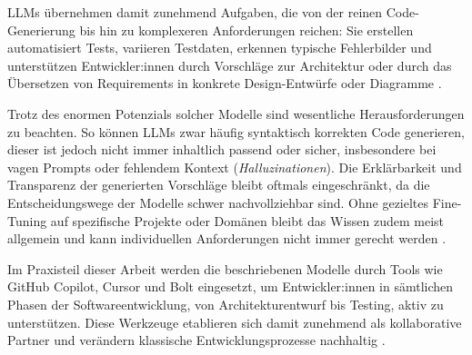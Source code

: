 LLMs übernehmen damit zunehmend Aufgaben, die von der reinen Code-Generierung
bis hin zu komplexeren Anforderungen reichen: Sie erstellen automatisiert
Tests, variieren Testdaten, erkennen typische Fehlerbilder und unterstützen
Entwickler:innen durch Vorschläge zur Architektur oder durch das Übersetzen von
Requirements in konkrete Design-Entwürfe oder Diagramme
\cite{esposito_generative_2025, nguyen-duc_generative_2023}.

Trotz des enormen Potenzials solcher Modelle sind wesentliche Herausforderungen
zu beachten. So können LLMs zwar häufig syntaktisch korrekten Code generieren,
dieser ist jedoch nicht immer inhaltlich passend oder sicher, insbesondere bei
vagen Prompts oder fehlendem Kontext (\textit{Halluzinationen}). Die
Erklärbarkeit und Transparenz der generierten Vorschläge bleibt oftmals
eingeschränkt, da die Entscheidungswege der Modelle schwer nachvollziehbar
sind. Ohne gezieltes Fine-Tuning auf spezifische Projekte oder Domänen bleibt
das Wissen zudem meist allgemein und kann individuellen Anforderungen nicht
immer gerecht werden \cite{esposito_generative_2025,
    nguyen-duc_generative_2023, donvir_role_2024}.

Im Praxisteil dieser Arbeit werden die beschriebenen Modelle durch Tools wie
GitHub Copilot, Cursor und Bolt eingesetzt, um Entwickler:innen in sämtlichen
Phasen der Softwareentwicklung, von Architekturentwurf bis Testing, aktiv zu
unterstützen. Diese Werkzeuge etablieren sich damit zunehmend als kollaborative
Partner und verändern klassische Entwicklungsprozesse nachhaltig
\cite{esposito_generative_2025, nguyen-duc_generative_2023}.

